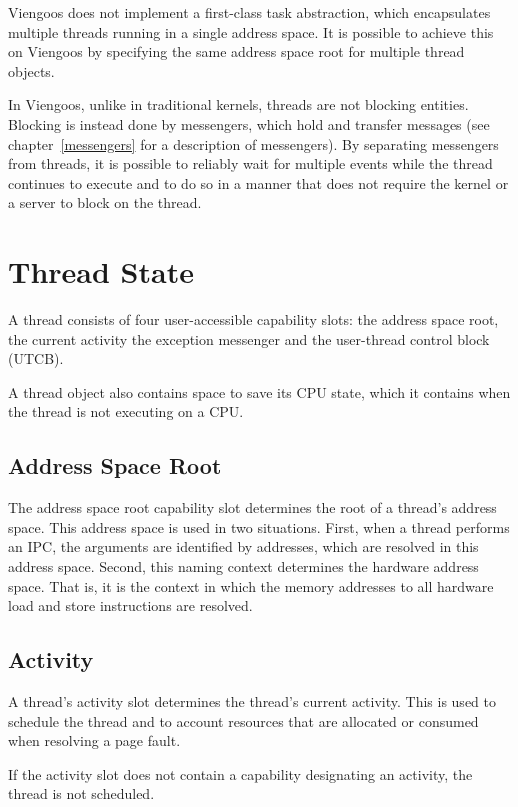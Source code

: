 Viengoos does not implement a first-class task abstraction, which
encapsulates multiple threads running in a single address space.  It
is possible to achieve this on Viengoos by specifying the same address
space root for multiple thread objects.

In Viengoos, unlike in traditional kernels, threads are not blocking
entities.  Blocking is instead done by messengers, which hold and
transfer messages (see chapter~\ref{messengers} for a description of
messengers).  By separating messengers from threads, it is possible to
reliably wait for multiple events while the thread continues to
execute and to do so in a manner that does not require the kernel or a
server to block on the thread.

\section{Thread State}

A thread consists of four user-accessible capability slots: the
address space root, the current activity the exception messenger and
the user-thread control block (UTCB).

A thread object also contains space to save its CPU state, which it
contains when the thread is not executing on a CPU.

\subsection{Address Space Root}

The address space root capability slot determines the root of a
thread's address space.  This address space is used in two situations.
First, when a thread performs an IPC, the arguments are identified by
addresses, which are resolved in this address space.  Second, this
naming context determines the hardware address space.  That is, it is
the context in which the memory addresses to all hardware load and
store instructions are resolved.

\subsection{Activity}

A thread's activity slot determines the thread's current activity.
This is used to schedule the thread and to account resources that are
allocated or consumed when resolving a page fault.

If the activity slot does not contain a capability designating an
activity, the thread is not scheduled.

